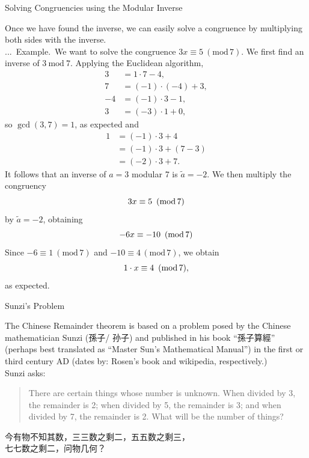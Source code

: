 \documentclass[smaller,hyperref={CJKbookmarks=true}]{beamer}
\newcounter{zhuo}[subsection]
\renewcommand{\thezhuo}{\thesection.\thesubsection.\arabic{zhuo}}
\newenvironment{EXAMPLE}{\stepcounter{zhuo}\alert{\!\thezhuo.~Example.\,}}{}
\begin{document}
\begin{frame}{Solving Congruencies using the Modular Inverse}
\begin{spacing}{1}
Once we have found the inverse, we can easily solve a congruence by
multiplying both sides with the inverse.\\[4pt]
\begin{EXAMPLE}
We want to solve the congruence $3x\equiv5~(\text{mod}\,7)$. We first find an inverse of $3\:\text{mod}\:7$. Applying the Euclidean algorithm,
\begin{align*}
  3 &=1\cdot7-4, \\
  7 &=(-1)\cdot(-4)+3, \\
  -4 &=(-1)\cdot3-1, \\
  3 &=(-3)\cdot1+0,
\end{align*}
so $\gcd(3,7)=1$, as expected and
\begin{equation*}
  \begin{split}
     1 &=(-1)\cdot3+4 \\
       &=(-1)\cdot3+(7-3) \\
       &=(-2)\cdot3+7.
  \end{split}
\end{equation*}
It follows that an inverse of $a=3$ modular 7 is $\widetilde{a}=-2$.
\end{EXAMPLE}
\newpage
We then multiply the congruency
\[3x\equiv 5\enskip(\text{mod}\,7)\]
by $\widetilde{a}=-2$, obtaining
\[-6x\equiv -10\enskip(\text{mod}\,7)\]
Since $-6\equiv1~(\text{mod}\,7)$ and $-10\equiv4\,(\text{mod}\,7)$, we obtain
\[1\cdot x\equiv4\enskip(\text{mod}\,7),\]
as expected.
\end{spacing}
\end{frame}
\begin{frame}[t]{Sunzi's Problem}
\begin{spacing}{1.1}
The Chinese Remainder theorem is based on a problem posed by the
Chinese mathematician Sunzi (孫子/ 孙子) and published in his book
``孫子算經'' (perhaps best translated as ``Master Sun's Mathematical
Manual'') in the first or third century AD (dates by: Rosen's book and
wikipedia, respectively.)\\[5pt]
Sunzi asks:\\[5pt]
\begin{quote}
There are certain things whose number is unknown. When
divided by 3, the remainder is 2; when divided by 5, the
remainder is 3; and when divided by 7, the remainder is 2. What
will be the number of things?
\end{quote}
\begin{center}
今有物不知其数，三三数之剩二，五五数之剩三，\\
七七数之剩二，问物几何？
\end{center}
\end{spacing}
\end{frame}
\end{document}

